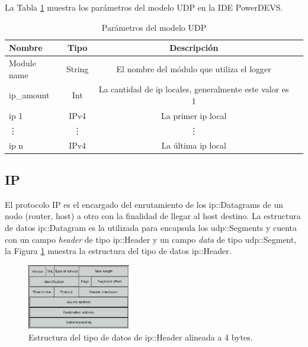 \documentclass[10pt,a4paper]{article}
\begin{document}
La Tabla \ref{table: parameters UDP} muestra los parámetros del modelo UDP en la IDE PowerDEVS.
\begin{table}[h]
\begin{tabular}{|l|c|c|c|}
  \hline
  \textbf{Nombre} & \textbf{Tipo} & \textbf{Descripción} \\
  \hline
  Module name & String & El nombre del módulo que utiliza el logger \\
  \hline
  ip\_amount & Int & La cantidad de ip locales, generalmente este valor es 1 \\
  \hline
  ip 1 & IPv4 & La primer ip local \\
  \hline
  \vdots & \vdots & \vdots \\
  \hline
  ip n & IPv4 & La última ip local \\
  \hline
\end{tabular}
\caption{Parámetros del modelo UDP}
\label{table: parameters UDP}
\end{table}

\subsection{IP}

El protocolo IP es el encargado del enrutamiento de los ip::Datagrams de un nodo (router, host) a otro con la finalidad de llegar al host destino. La estructura de datos ip::Datagram es la utilizada para encapsula los udp::Segments y cuenta con un campo \textit{header} de tipo ip::Header y un campo \textit{data} de tipo udp::Segment, la Figura \ref{figure: ip header} muestra la estructura del tipo de datos ip::Header.  \\

\begin{figure}[!htb]
    \centering
    \includegraphics[width = 0.4\textwidth]{img/png/IP-datagram.png}
    \caption{Estructura del tipo de datos de ip::Header alineada a 4 bytes.}
    \label{figure: ip header}
\end{figure}
\end{document}
